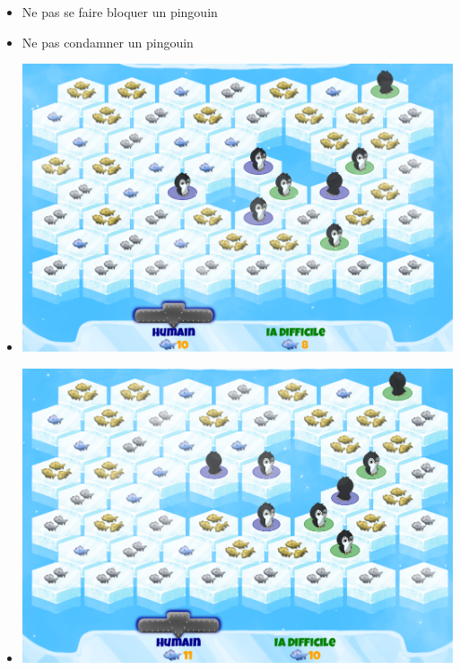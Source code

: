 \documentclass{beamer}
\begin{document}
\begin{frame}{}
\begin{block}{}
\begin{itemize}
 \item<1-> Ne pas se faire bloquer un pingouin
 \item<2-> Ne pas condamner un pingouin
 \item<3-> \includegraphics[scale=0.09]{IA7}
 \item<4-> \includegraphics[scale=0.09]{IA8}
\end{itemize}
\end{block}
\end{frame}
\end{document}
